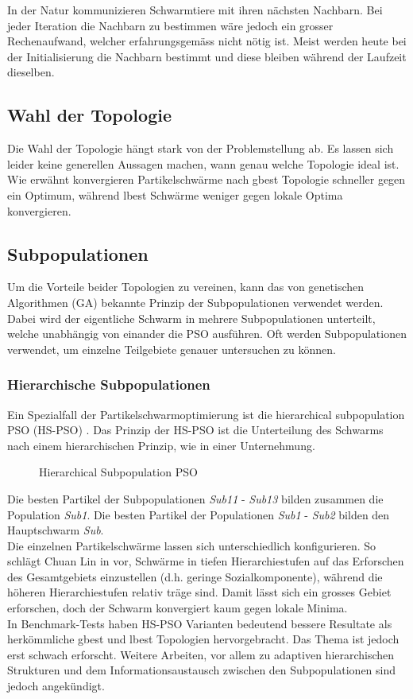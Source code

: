 In der Natur kommunizieren Schwarmtiere mit ihren nächsten Nachbarn. Bei jeder Iteration die Nachbarn zu bestimmen wäre jedoch ein grosser Rechenaufwand, welcher erfahrungsgemäss nicht nötig ist. Meist werden heute bei der Initialisierung die Nachbarn bestimmt und diese bleiben während der Laufzeit dieselben.

\subsection{Wahl der Topologie}
Die Wahl der Topologie hängt stark von der Problemstellung ab. Es lassen sich leider keine generellen Aussagen machen, wann genau welche Topologie ideal ist. Wie erwähnt konvergieren Partikelschwärme nach gbest Topologie schneller gegen ein Optimum, während lbest Schwärme weniger gegen lokale Optima konvergieren.

\subsection{Subpopulationen}
Um die Vorteile beider Topologien zu vereinen, kann das von genetischen Algorithmen (GA) bekannte Prinzip der Subpopulationen verwendet werden. Dabei wird der eigentliche Schwarm in mehrere Subpopulationen unterteilt, welche unabhängig von einander die PSO ausführen. Oft werden Subpopulationen verwendet, um einzelne Teilgebiete genauer untersuchen zu können.


\subsubsection{Hierarchische Subpopulationen}
Ein Spezialfall der Partikelschwarmoptimierung ist die hierarchical subpopulation PSO (HS-PSO) \cite{ChuanLin-HSPSO}. Das Prinzip der HS-PSO ist die Unterteilung des Schwarms nach einem hierarchischen Prinzip, wie in einer Unternehmung.

\begin{figure}[htbp]
	\centering
	
	\caption{Hierarchical Subpopulation PSO}
	\label{hs-pso}
\end{figure}

Die besten Partikel der Subpopulationen \textit{Sub11} - \textit{Sub13} bilden zusammen die Population \textit{Sub1}. Die besten Partikel der Populationen \textit{Sub1} - \textit{Sub2} bilden den Hauptschwarm \textit{Sub}. \\

Die einzelnen Partikelschwärme lassen sich unterschiedlich konfigurieren. So schlägt Chuan Lin in \cite{ChuanLin-HSPSO} vor, Schwärme in tiefen Hierarchiestufen auf das Erforschen des Gesamtgebiets einzustellen (d.h. geringe Sozialkomponente), während die höheren Hierarchiestufen relativ träge sind. Damit lässt sich ein grosses Gebiet erforschen, doch der Schwarm konvergiert kaum gegen lokale Minima. \\

In Benchmark-Tests haben HS-PSO Varianten bedeutend bessere Resultate als herkömmliche gbest und lbest Topologien hervorgebracht. Das Thema ist jedoch erst schwach erforscht. Weitere Arbeiten, vor allem zu adaptiven hierarchischen Strukturen und dem Informationsaustausch zwischen den Subpopulationen sind jedoch angekündigt.

